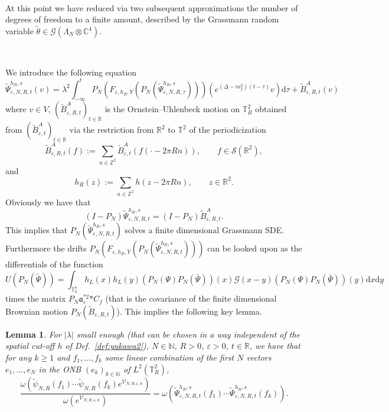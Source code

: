 \documentclass{article}
\newcommand{\assign}{:=}
\newcommand{\asterisk}{\mathord{*}}
\newcommand{\mathd}{\mathrm{d}}
\newtheorem{lemma}[theorem]{Lemma}
\begin{document}
\

At this point we have reduced via two subsequent approximations the number of
degrees of freedom to a finite amount, described by the Grassmann random
variable $\tilde{\theta} \in \mathcal{G} (\Lambda_N \otimes \mathbb{C}^4)$.

\

We introduce the following equation
\begin{equation}
  \tilde{\Psi}^{h_R, s}_{\varepsilon, N, R, t} (v) = \lambda^2 \int_{-
  \infty}^t P_N (F_{\varepsilon, h_R, Y} (P_N (\tilde{\Psi}_{\varepsilon, N,
  R, \tau}^{h_R, s}))) (e^{(\Delta - m^2_f) (t - \tau)} v) \mathd \tau +
  \tilde{B}_{\varepsilon, R, t}^A (v) \label{eq:finitedimensional}
\end{equation}
where $v \in V$, $(\tilde{B}_{\varepsilon, R, t}^A)_{t \in \mathbb{R}}$ is the
Ornstein--Uhlenbeck motion on $\mathbb{T}^2_R$ obtained from
$(\tilde{B}_{\varepsilon, t}^A)_{t \in \mathbb{R}}$ via the restriction from
$\mathbb{R}^2$ to $\mathbb{T}^2$ of the periodicization
\[ \tilde{B}_{\varepsilon, R, t}^A (f) \assign \sum_{n \in \mathbb{Z}^2}
   \tilde{B}_{\varepsilon, t}^A (f (\cdot - 2 \pi R n)), \qquad f \in
   \mathcal{S} (\mathbb{R}^2), \]
and
\[ h_R (z) \assign \sum_{n \in \mathbb{Z}^2} h (z - 2 \pi R n), \qquad z \in
   \mathbb{R}^2 . \]
Obviously we have that
\[ (I - P_N) \tilde{\Psi}_{\varepsilon, N, R, t}^{h_R, s} = (I - P_N)
   \tilde{B}^A_{\varepsilon, R, t} . \]
This implies that $P_N (\tilde{\Psi}_{\varepsilon, N, R, t}^{h_R, s})$ solves
a finite dimensional Grassmann SDE. Furthermore the drifts $P_N
(F_{\varepsilon, h_R, Y} (P_N (\tilde{\Psi}_{\varepsilon, N, R, t}^{h_R,
s})))$ can be looked upon as the differentials of the function
\[ U (P_N (\tilde{\Psi})) = \int_{\mathbb{T}_L^4} h_L (x) h_L (y) (P_N (\Psi)
   P_N (\bar{\Psi})) (x) \mathcal{G} (x - y) (P_N (\Psi) P_N (\bar{\Psi})) (y)
   \mathd x \mathd y \]
times the matrix $P_N \mathfrak{a}_{\varepsilon}^{\asterisk 2} \asterisk C_f$
(that is the covariance of the finite dimensional Brownian motion $P_N
(\tilde{B}_{\varepsilon, R, t})$). This implies the following key lemma.

\begin{lemma}
  \label{lemma_finite1}For $| \lambda |$ small enough (that can be chosen in a
  way independent of the spatial cut-off $h$ of Def.~\ref{def:yukawa2}), $N
  \in \mathbb{N}$, $R > 0$, $\varepsilon > 0$, $t \in \mathbb{R}$, we have
  that for any $k \geqslant 1$ and $f_1, \ldots, f_k$ some linear combination
  of the first $N$ vectors $e_1, \ldots, e_N$ in the ONB $(e_k)_{k \in
  \mathbb{N}}$ of $L^2 (\mathbb{T}^2_R)$,
  \[ \frac{\omega (\tilde{\psi}_{N, R} (f_1) \cdots \tilde{\psi}_{N, R} (f_k)
     e^{\mathcal{V}_{N, R, \varepsilon, h}})}{\omega (e^{\mathcal{V}_{N, R,
     \varepsilon, h}})} = \omega (\tilde{\Psi}_{\varepsilon, N, R, t}^{h_R, s}
     (f_1) \cdots \tilde{\Psi}_{\varepsilon, N, R, t}^{h_R, s} (f_k)) . \]
\end{lemma}
\end{document}
